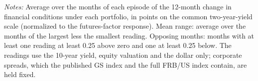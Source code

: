 \begin{table}[tbp]\centering
\caption{Four Readings of Three Episodes}\label{tab:ep4}
\begin{flushleft}\footnotesize\textit{Notes:} Average over the months of each episode of the 12-month change in financial conditions under each portfolio, in points on the common two-year-yield scale (normalized to the futures-factor response). Mean range: average over the months of the largest less the smallest reading. Opposing months: months with at least one reading at least 0.25 above zero and one at least 0.25 below. The readings use the 10-year yield, equity valuation and the dollar only; corporate spreads, which the published GS index and the full FRB/US index contain, are held fixed.\end{flushleft}
\end{table}

